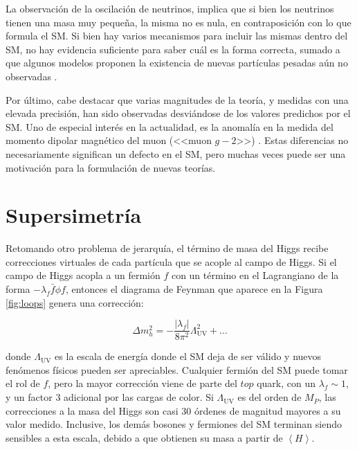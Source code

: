 La observación de la oscilación de neutrinos, implica que si bien los neutrinos tienen una masa muy pequeña, la misma no es nula, en contraposición con lo que formula el SM. Si bien hay varios mecanismos para incluir las mismas dentro del SM, no hay evidencia suficiente para saber cuál es la forma correcta, 
sumado a que algunos modelos proponen la existencia de nuevas partículas pesadas aún no observadas \cite{gellmann2013,Sawada:1979dis,Glashow:1979nm,Ramond1998}.

Por último, cabe destacar que varias magnitudes de la teoría, y medidas con una elevada precisión, han sido observadas desviándose de los valores predichos por el SM. Uno de especial interés en la actualidad, es la anomalía en la medida del momento dipolar magnético del muon (<<muon $g-2$>>) \cite{Muong-2:2021ojo}. Estas diferencias no necesariamente significan un defecto en el SM, pero muchas veces puede ser una motivación para la formulación de nuevas teorías.

\section{Supersimetría}\label{sec:susy}

Retomando otro problema de jerarquía, el término de masa del Higgs recibe correcciones virtuales de cada partícula que se acople al campo de Higgs. 
Si el campo de Higgs acopla a un fermión $f$ con un término en el Lagrangiano de la forma $-\lambda_f \bar{f} \phi f$, entonces el diagrama de Feynman que aparece en la Figura \ref{fig:loops} genera una corrección:


\begin{equation}
	\Delta m_h^2 = - \frac{|\lambda_f|}{8 \pi^2}\Lambda_{\text{UV}}^2 + ...
\end{equation}

\noindent
donde $\Lambda_{\text{UV}}$ es la escala de energía donde el SM deja de ser válido y nuevos fenómenos físicos pueden ser apreciables. Cualquier fermión del SM puede tomar el rol de $f$, pero la mayor corrección viene de parte del $top$ quark, con un $\lambda_f\sim1$, y un factor $3$ adicional por las cargas de color. Si $\Lambda_{\text{UV}}$ es del orden de $M_P$, las correcciones a la masa del Higgs son casi 30 órdenes de magnitud mayores a su valor medido. 
Inclusive, los demás bosones y fermiones del SM terminan siendo sensibles a esta escala, debido a que obtienen su masa a partir de $\left<H\right>$.

